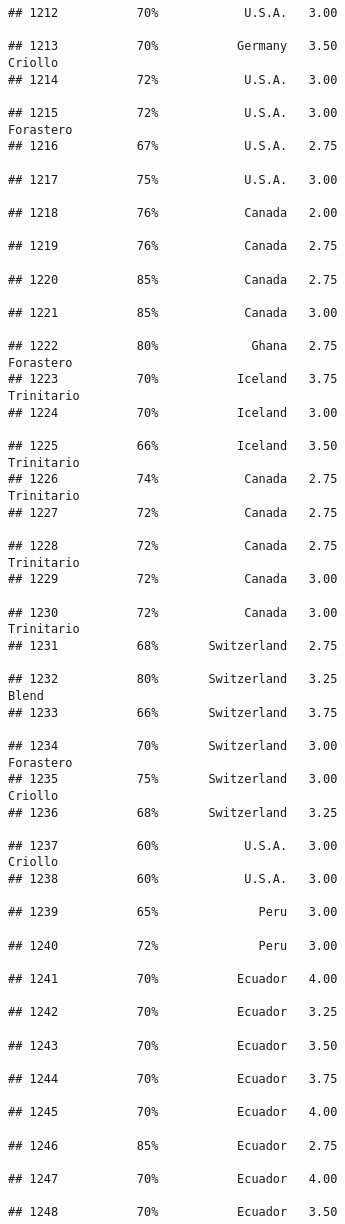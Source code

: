\documentclass[
]{article}
\begin{document}
\begin{verbatim}
## 1212           70%            U.S.A.   3.00                         
## 1213           70%           Germany   3.50                  Criollo
## 1214           72%            U.S.A.   3.00                         
## 1215           72%            U.S.A.   3.00                Forastero
## 1216           67%            U.S.A.   2.75                         
## 1217           75%            U.S.A.   3.00                         
## 1218           76%            Canada   2.00                         
## 1219           76%            Canada   2.75                         
## 1220           85%            Canada   2.75                         
## 1221           85%            Canada   3.00                         
## 1222           80%             Ghana   2.75                Forastero
## 1223           70%           Iceland   3.75               Trinitario
## 1224           70%           Iceland   3.00                         
## 1225           66%           Iceland   3.50               Trinitario
## 1226           74%            Canada   2.75               Trinitario
## 1227           72%            Canada   2.75                         
## 1228           72%            Canada   2.75               Trinitario
## 1229           72%            Canada   3.00                         
## 1230           72%            Canada   3.00               Trinitario
## 1231           68%       Switzerland   2.75                         
## 1232           80%       Switzerland   3.25                    Blend
## 1233           66%       Switzerland   3.75                         
## 1234           70%       Switzerland   3.00                Forastero
## 1235           75%       Switzerland   3.00                  Criollo
## 1236           68%       Switzerland   3.25                         
## 1237           60%            U.S.A.   3.00                  Criollo
## 1238           60%            U.S.A.   3.00                         
## 1239           65%              Peru   3.00                         
## 1240           72%              Peru   3.00                         
## 1241           70%           Ecuador   4.00                         
## 1242           70%           Ecuador   3.25                         
## 1243           70%           Ecuador   3.50                         
## 1244           70%           Ecuador   3.75                         
## 1245           70%           Ecuador   4.00                         
## 1246           85%           Ecuador   2.75                         
## 1247           70%           Ecuador   4.00                         
## 1248           70%           Ecuador   3.50                         

\end{verbatim}
\end{document}
